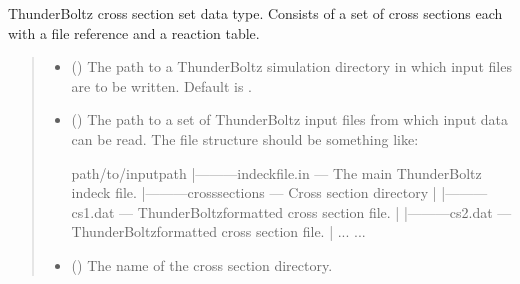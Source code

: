\documentclass[letterpaper,10pt,english,openany,oneside]{sphinxmanual}
\begin{document}
\begin{fulllineitems}
\label{\detokenize{api/pytb.CrossSections:pytb.CrossSections}}
\pysigstartsignatures
{}
\pysigstopsignatures
\sphinxAtStartPar
ThunderBoltz cross section set data type. Consists of
a set of cross sections each with a file reference and a
reaction table.
\begin{quote}\begin{description}
\begin{itemize}
\item {} 
\sphinxAtStartPar
{} () \textendash{} The path to a ThunderBoltz simulation
directory in which input files are to be written.
Default is .

\item {} 
\sphinxAtStartPar
{} () \textendash{} 
\sphinxAtStartPar
The path to a set of ThunderBoltz
input files from which input data can be read.
The file structure should be something like:

\begin{sphinxVerbatim}[commandchars=\\\{\}]
path/to/input\PYGZus{}path
 |———indeck\PYGZus{}file.in  \PYGZlt{}— The main ThunderBoltz indeck file.
 |———cross\PYGZus{}sections  \PYGZlt{}— Cross section directory
 |   |———cs1.dat     \PYGZlt{}— ThunderBoltz\PYGZhy{}formatted cross section file.
 |   |———cs2.dat     \PYGZlt{}— ThunderBoltz\PYGZhy{}formatted cross section file.
 |   ...
 ...
\end{sphinxVerbatim}


\item {} 
\sphinxAtStartPar
{} () \textendash{} The name of the cross section directory.


\end{itemize}
\end{description}
\end{quote}
\end{fulllineitems}
\end{document}
